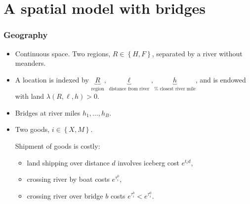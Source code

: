 \documentclass[compress,mathserif]{beamer}
\begin{document}
\section{A spatial model with bridges}

\begin{frame}%
\frametitle{Geography}

\begin{itemize}
\item Continuous space. Two regions, $R\in \left \{ H,F\right \} $,
separated by a river without meanders.

\item A location is indexed by $\underset{\text{region}}{\underbrace{R}},%
\underset{\text{distance from river}}{\underbrace{\ell }},\underset{\text{%
closest river mile}}{\underbrace{h}}$,\newline
\newline
and is endowed with land $\lambda \left( R,\ell ,h\right) >0$.

\item Bridges at river miles $h_{1},\ldots ,h_{B}$.

\item Two goods, $i\in \left \{ X,M\right \} $.

Shipment of goods is costly:

\begin{itemize}
\item land shipping over distance $d$ involves iceberg cost $e^{t_{i}d}$,

\item crossing river by boat costs $e^{\tau _{i}^{0}}$,

\item crossing river over bridge $b$ costs $e^{\tau _{i}^{b}}<e^{\tau
_{i}^{0}}$.
\end{itemize}
\end{itemize}

\end{frame}%
\end{document}
